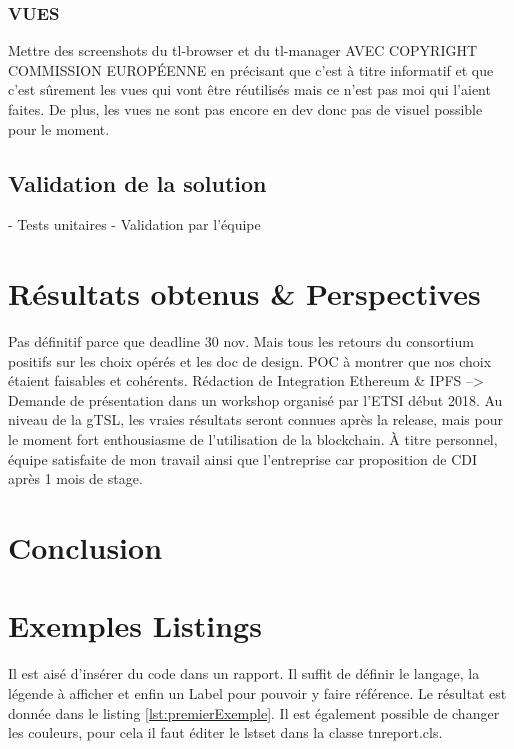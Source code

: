 \documentclass{tnreport}
\begin{document}
\subsection{VUES}
\label{sec:views}

Mettre des screenshots du tl-browser et du tl-manager AVEC COPYRIGHT COMMISSION EUROPÉENNE en précisant que c'est à titre informatif et que c'est sûrement les vues qui vont être réutilisés mais ce n'est pas moi qui l'aient faites. De plus, les vues ne sont pas encore en dev donc pas de visuel possible pour le moment.

\section{Validation de la solution}

- Tests unitaires
- Validation par l'équipe

\chapter{Résultats obtenus \& Perspectives}

Pas définitif parce que deadline 30 nov.
Mais tous les retours du consortium positifs sur les choix opérés et les doc de design.
POC à montrer que nos choix étaient faisables et cohérents.
Rédaction de Integration Ethereum \& IPFS --> Demande de présentation dans un workshop organisé par l'ETSI début 2018.
Au niveau de la gTSL, les vraies résultats seront connues après la release, mais pour le moment fort enthousiasme de l'utilisation de la blockchain.
À titre personnel, équipe satisfaite de mon travail ainsi que l'entreprise car proposition de CDI après 1 mois de stage.

\chapter{Conclusion}

\cleardoublepage

\chapter{Exemples Listings}

Il est aisé d'insérer du code dans un rapport. Il suffit de définir le langage, la légende à afficher et enfin un Label pour pouvoir y faire référence. Le résultat est donnée dans le listing \ref{lst:premierExemple}. Il est également possible de changer les couleurs, pour cela il faut éditer le lstset dans la classe tnreport.cls.
\end{document}
